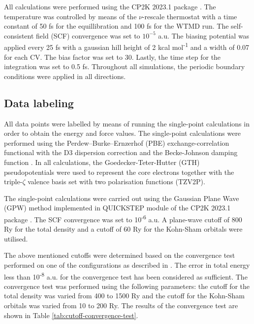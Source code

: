 All calculations were performed using the CP2K 2023.1 package \citep{kuhneCP2KElectronicStructure2020}. The temperature was controlled by means of the $\nu$-rescale thermostat \citep{bussiCanonicalSamplingVelocity2007} with a time constant of 50 fs for the equillibration and 100 fs for the WTMD run. The self-consistent field (SCF) convergence was set to $10^{-5}$ a.u. The biasing potential was applied every 25 fs with a gaussian hill height of 2 kcal mol\textsuperscript{-1} and a width of 0.07 for each CV. The bias factor was set to 30. Lastly, the time step for the integration was set to 0.5 fs. Throughout all simulations, the periodic boundary conditions were applied in all directions.



\subsection{Data labeling}
All data points were labelled by means of running the single-point calculations in order to obtain the energy and force values. The single-point calculations were performed using the Perdew–Burke–Ernzerhof (PBE) exchange-correlation functional \citep{perdewGeneralizedGradientApproximation1996} with the D3 dispersion correction and the Becke-Johnson damping function \citep{grimmeConsistentAccurateInitio2010,grimmeEffectDampingFunction2011}. In all calculations, the Goedecker-Teter-Hutter (GTH) pseudopotentials \citep{goedeckerSeparableDualspaceGaussian1996,hartwigsenRelativisticSeparableDualspace1998} were used to represent the core electrons together with the triple-$\zeta$ valence basis set with two polarisation functions (TZV2P).

The single-point calculations were carried out using the Gaussian Plane Wave (GPW) method  implemented in QUICKSTEP module \citep{vandevondeleQuickstepFastAccurate2005} of the CP2K 2023.1 package \citep{kuhneCP2KElectronicStructure2020}. The SCF convergence was set to 10\textsuperscript{-6} a.u. A plane-wave cutoff of 800 Ry for the total density and a cutoff of 60 Ry for the Kohn-Sham orbitals were utilised. 

The above mentioned cutoffs were determined based on the convergence test performed on one of the configurations as described in \citep{cp2k_developersHowConvergeCUTOFF}. The error in total energy less than 10\textsuperscript{-8} a.u. for the convergence test has been considered as sufficient. The convergence test was performed using the following parameters: the cutoff for the total density was varied from 400 to 1500 Ry and the cutoff for the Kohn-Sham orbitals was varied from 10 to 200 Ry. The results of the convergence test are shown in Table \ref{tab:cutoff-convergence-test}.




